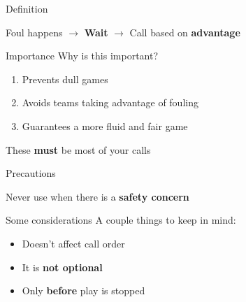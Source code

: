 \begin{frame}{Definition}
    \begin{center}
        Foul happens \pause{}
        $\rightarrow$ \textbf{Wait} \pause{}
        $\rightarrow$ Call based on \textbf{advantage}
    \end{center}
\end{frame}

\begin{frame}{Importance}
    Why is this important? \pause{}

    \begin{enumerate}
        \item Prevents dull games
        \item Avoids teams taking advantage of fouling
        \item Guarantees a more fluid and fair game
    \end{enumerate}

    \pause{}

    \begin{center}
        These \textbf{must} be most of your calls
    \end{center}
\end{frame}

\begin{frame}{Precautions}
    \begin{center}
        Never use when there is a \textbf{safety concern}
    \end{center}
\end{frame}

\begin{frame}{Some considerations}
    A couple things to keep in mind:

    \begin{itemize}
        \item Doesn't affect call order \pause{}
        \item It is \textbf{not optional} \pause{}
        \item Only \textbf{before} play is stopped
    \end{itemize}
\end{frame}